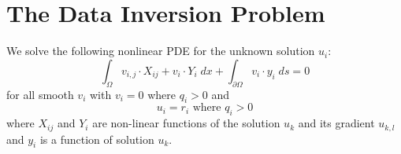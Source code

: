 \chapter{The Data Inversion Problem}
\label{APP: FITTER}

We solve the following nonlinear PDE for the unknown solution $u_i$:
\begin{equation} \label{APP FIT EQU 1a}
\int_{\Omega} v_{i,j} \cdot X_{ij} + v_{i} \cdot Y_{i} \; dx
+ \int_{\partial \Omega}  v_{i} \cdot y_{i} \; ds  = 0 
\end{equation}
for all smooth $v_i$ with $v_i=0$ where $q_i>0$ and
\begin{equation} \label{APP FIT EQU 1b}
u_i=r_i \mbox{ where } q_i>0
\end{equation}
where $X_{ij}$ and $Y_i$ are non-linear functions of the solution $u_k$ and its gradient $u_{k,l}$
and $y_i$ is a function of solution $u_k$. 

